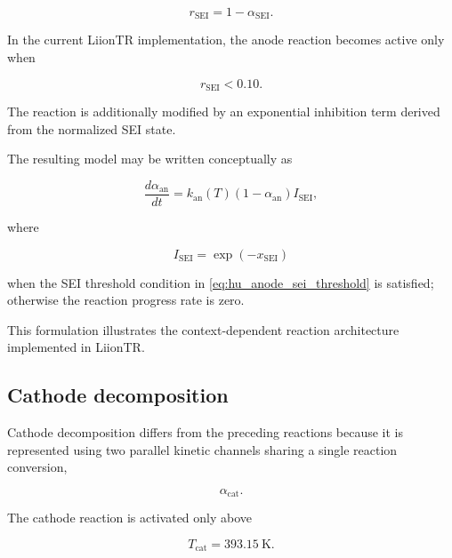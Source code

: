 \begin{equation}
    r_{\mathrm{SEI}}
    =
    1-\alpha_{\mathrm{SEI}}.
\end{equation}

In the current LiionTR implementation, the anode reaction becomes active
only when

\begin{equation}
    r_{\mathrm{SEI}}
    <
    0.10.
    \label{eq:hu_anode_sei_threshold}
\end{equation}

The reaction is additionally modified by an exponential inhibition term
derived from the normalized SEI state.

The resulting model may be written conceptually as

\begin{equation}
    \frac{d\alpha_{\mathrm{an}}}{dt}
    =
    k_{\mathrm{an}}(T)
    \left(
        1-\alpha_{\mathrm{an}}
    \right)
    I_{\mathrm{SEI}},
    \label{eq:hu_anode_progress}
\end{equation}

where

\begin{equation}
    I_{\mathrm{SEI}}
    =
    \exp
    \left(
        -x_{\mathrm{SEI}}
    \right)
\end{equation}

when the SEI threshold condition in
\cref{eq:hu_anode_sei_threshold} is satisfied; otherwise the reaction
progress rate is zero.

This formulation illustrates the context-dependent reaction architecture
implemented in LiionTR.


\subsection{Cathode decomposition}

Cathode decomposition differs from the preceding reactions because it is
represented using two parallel kinetic channels sharing a single
reaction conversion,

\begin{equation}
    \alpha_{\mathrm{cat}}.
\end{equation}

The cathode reaction is activated only above

\begin{equation}
    T_{\mathrm{cat}}
    =
    \SI{393.15}{\kelvin}.
    \label{eq:hu_cathode_threshold}
\end{equation}

